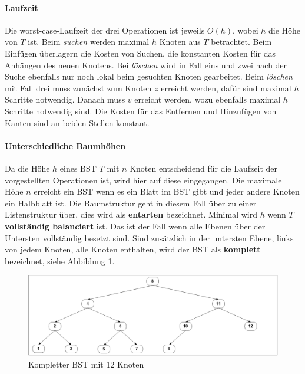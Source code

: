 \documentclass[a4paper,12pt]{article}
\begin{document}
\paragraph{Laufzeit}
Die worst-case-Laufzeit der drei Operationen ist jeweils $\mathit{O(h)}$, wobei $h$ die Höhe von $T$ ist. Beim \textit{suchen} werden maximal $h$ Knoten aus $T$ betrachtet. Beim Einfügen überlagern die Kosten von Suchen, die konstanten Kosten für das Anhängen des neuen Knotens. Bei \textit{löschen} wird in Fall eins und zwei nach der Suche ebenfalls nur noch lokal beim gesuchten Knoten gearbeitet. Beim \textit{löschen} mit Fall drei muss zunächst zum Knoten $z$ erreicht werden, dafür sind maximal $h$ Schritte notwendig. Danach muss $v$ erreicht werden, wozu ebenfalls maximal $h$ Schritte notwendig sind. Die Kosten für das Entfernen und Hinzufügen von Kanten sind an beiden Stellen konstant.  



\paragraph{Unterschiedliche Baumhöhen}
Da die Höhe $h$ eines BST $T$ mit $n$ Knoten entscheidend für die Laufzeit der vorgestellten Operationen ist, wird hier auf diese eingegangen. Die maximale Höhe $n$ erreicht ein BST wenn es ein Blatt im BST gibt und jeder andere Knoten ein Halbblatt ist. Die Baumstruktur geht in diesem Fall über zu einer Listenstruktur über, dies wird als \textbf{entarten} bezeichnet. Minimal wird $h$ wenn $T$ \textbf{vollständig balanciert} ist. Das ist der Fall wenn alle Ebenen über der Untersten vollständig besetzt sind. Sind zusätzlich in der untersten Ebene, links von jedem Knoten, alle Knoten enthalten, wird der BST als \textbf{komplett} bezeichnet, siehe Abbildung \ref{fig:kompletterBaum}. 
\begin{figure}[h]
	\centering
	\includegraphics[width= 1\textwidth]{"Medien/Einleitung/kompletterBaum"}
	\caption{Kompletter BST mit 12 Knoten}
	\label{fig:kompletterBaum}
\end{figure}
\end{document}
